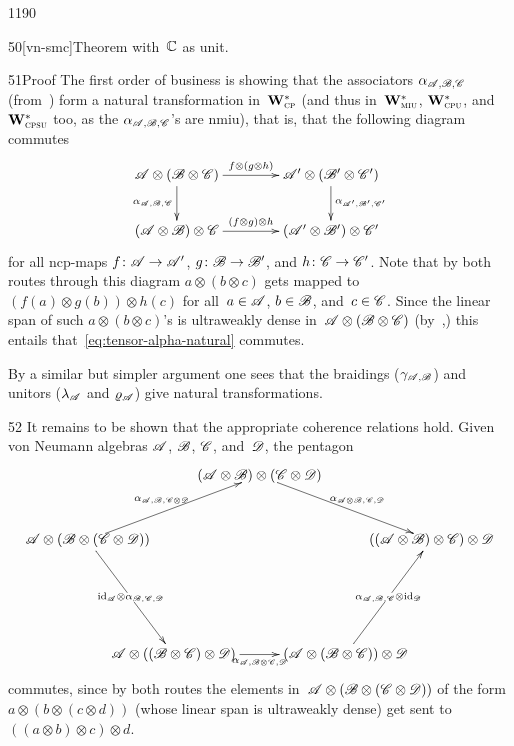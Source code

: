 \begin{parsec}{1190}
\begin{point}{50}[vn-smc]{Theorem}
with~$\mathbb{C}$ as unit.
\begin{point}{51}{Proof}%
The first order of business is showing that
the associators $\alpha_{\mathscr{A},\mathscr{B},\mathscr{C}}$
(from~)
form a natural transformation
    in~$\mathbf{W}^*_{\text{\textsc{cp}}}$
    (and thus in~$\mathbf{W}^*_{\text{\textsc{miu}}}$,
    $\mathbf{W}^*_{\text{\textsc{cpu}}}$, and $\mathbf{W}^*_{\text{\textsc{cpsu}}}$ too,
    as the $\alpha_{\mathscr{A},\mathscr{B},\mathscr{C}}$'s are nmiu),
that is, 
that the following diagram commutes
\begin{equation}
    \label{eq:tensor-alpha-natural}
    \xymatrix@C=4em{
\scrA\otimes(\scrB\otimes\scrC)
    \ar[r]^-{f\otimes(g\otimes h)}
    \ar[d]_-{\alpha_{\scrA,\scrB,\scrC}}
&
\scrA'\otimes(\scrB'\otimes\scrC')
    \ar[d]^-{\alpha_{\scrA',\scrB',\scrC'}}
\\
(\scrA\otimes\scrB)\otimes\scrC
    \ar[r]^-{(f\otimes g)\otimes h}
&
(\scrA'\otimes \scrB')\otimes \scrC'
}
\end{equation}
for all ncp-maps $f\colon \mathscr{A}\to \mathscr{A}'$,
    $g\colon \mathscr{B}\to\mathscr{B}'$,
    and $h\colon \mathscr{C}\to\mathscr{C}'$.
Note that by both routes through this diagram
$a\otimes (b\otimes c)$
gets mapped to $(f(a)\otimes g(b))\otimes h(c)$
for all~$a\in\mathscr{A}$, $b\in\mathscr{B}$, and~$c\in \mathscr{C}$.
Since the linear span of such
$a\otimes (b\otimes c)$'s
is ultraweakly dense in~$\mathscr{A}\otimes(\mathscr{B}\otimes \mathscr{C})$
    (by~,)
this entails that~\eqref{eq:tensor-alpha-natural} commutes.

By a similar but simpler argument one sees
that the braidings ($\gamma_{\mathscr{A},\mathscr{B}}$) and unitors
($\lambda_{\mathscr{A}}$ and $\varrho_{\mathscr{A}}$)
give natural transformations.
\begin{point}{52}%
It remains to be shown
that the appropriate coherence relations hold.
Given von Neumann algebras $\mathscr{A}$, $\mathscr{B}$,
$\mathscr{C}$, and~$\mathscr{D}$,
the pentagon
    \newcommand{\wrapcell}[1]{\hbox to 2em{\hss $#1$\hss}}
\begin{equation*}
\xymatrix@C=.1em@R=3em{
    && \wrapcell{(\scrA\otimes \scrB)\otimes (\scrC\otimes \scrD) } 
    \ar[rrd]^{\alpha_{\scrA\otimes\scrB,\scrC,\scrD}}
    && \\
    \wrapcell{\scrA\otimes(\scrB\otimes (\scrC \otimes \scrD))}
    \ar[rru]^{\alpha_{\scrA,\scrB,\scrC\otimes\scrD}}
    \ar[ddr]|{\id_\scrA\otimes\alpha_{\scrB,\scrC,\scrD}}
    &&&&
    \wrapcell{((\scrA\otimes \scrB)\otimes \scrC)\otimes \scrD}
    \\
    \\
    & 
    {\scrA\otimes((\scrB\otimes \scrC)\otimes\scrD)}
    \ar[rr]_{\alpha_{\scrA,\scrB\otimes\scrC,\scrD}}
    &&
    {(\scrA\otimes (\scrB\otimes \scrC))\otimes\scrD}
    \ar[ruu]|{\alpha_{\scrA,\scrB,\scrC}\otimes \id_\scrD}
}
\end{equation*}
commutes,
since by both routes
the elements in~$\mathscr{A}\otimes(\mathscr{B}\otimes (\mathscr{C}\otimes \mathscr{D}))$
of the form $a\otimes (b\otimes (c\otimes d))$
(whose linear span is ultraweakly dense)
get sent to $((a\otimes b)\otimes c)\otimes d$.


\end{point}
\end{point}
\end{point}
\end{parsec}
